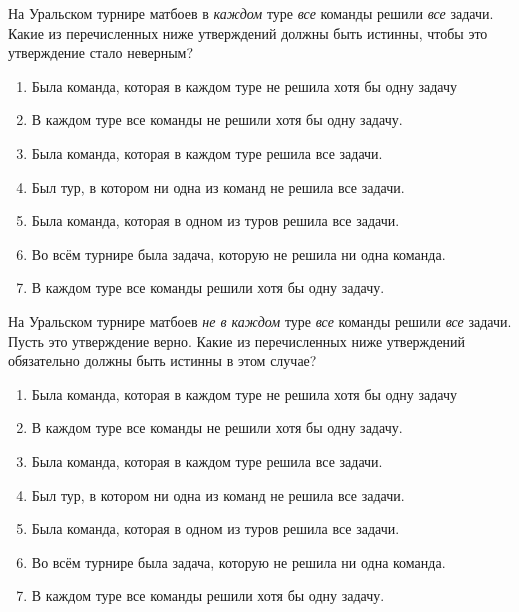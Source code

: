 \begin{thm}
    На Уральском турнире матбоев в \textit{каждом} туре \textit{все} команды решили \textit{все} задачи. Какие из перечисленных ниже утверждений должны быть истинны\footnotemark, чтобы это утверждение стало неверным?
    
    \begin{enumerate}[label=\asbuk*), ref=\asbuk*]
        \item Была команда, которая в каждом туре не решила хотя бы одну задачу
        \item В каждом туре все команды не решили хотя бы одну задачу.
        \item Была команда, которая в каждом туре решила все задачи.
        \item Был тур, в котором ни одна из команд не решила все задачи.
        \item Была команда, которая в одном из туров решила все задачи.
        \item Во всём турнире была задача, которую не решила ни одна команда.
        \item В каждом туре все команды решили хотя бы одну задачу.
    \end{enumerate}
    
\end{thm}


\begin{thm}
    На Уральском турнире матбоев \textit{не в каждом} туре \textit{все} команды решили \textit{все} задачи. Пусть это утверждение верно. Какие из перечисленных ниже утверждений обязательно должны быть истинны в этом случае?\footnotemark

    \begin{enumerate}[label=\asbuk*), ref=\asbuk*]
        \item Была команда, которая в каждом туре не решила хотя бы одну задачу
        \item В каждом туре все команды не решили хотя бы одну задачу.
        \item Была команда, которая в каждом туре решила все задачи.
        \item Был тур, в котором ни одна из команд не решила все задачи.
        \item Была команда, которая в одном из туров решила все задачи.
        \item Во всём турнире была задача, которую не решила ни одна команда.
        \item В каждом туре все команды решили хотя бы одну задачу.
    \end{enumerate}
\end{thm}


